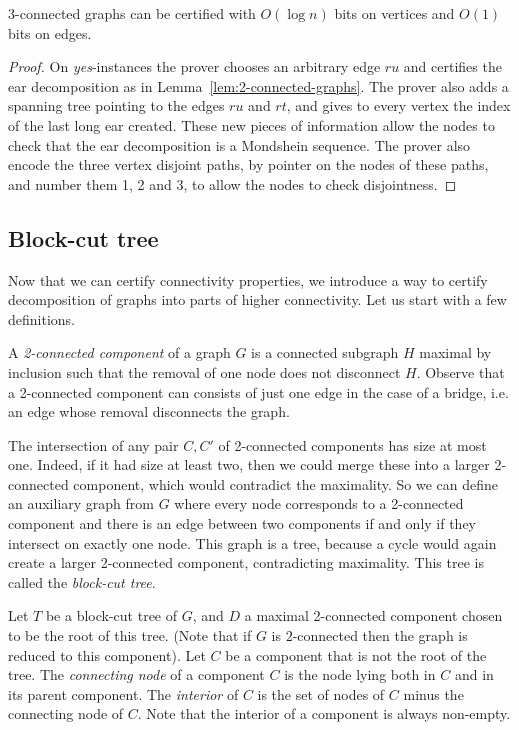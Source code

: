 \documentclass[a4paper,thm-restate,USenglish]{lipics-v2019}
\begin{document}
\begin{corollary}\label{coro:3-connected}
3-connected graphs can be certified with $O(\log n)$ bits on vertices and $O(1)$ bits on edges.
\end{corollary}

\begin{proof}
On \emph{yes}-instances the prover chooses an arbitrary edge $ru$ and certifies the ear decomposition as in Lemma~\ref{lem:2-connected-graphs}.
The prover also adds a spanning tree pointing to the edges $ru$ and $rt$, and gives to every vertex the index of the last long ear created.
These new pieces of information allow the nodes to check that the ear decomposition is a Mondshein sequence.
The prover also encode the three vertex disjoint paths, by pointer on the nodes of these paths, and number them 1, 2 and 3, to allow the nodes to check disjointness. 
\end{proof}

\subsection{Block-cut tree}

Now that we can certify connectivity properties, we introduce a way to certify decomposition of graphs into parts of higher connectivity. Let us start with a few definitions.

A \emph{2-connected component} of a graph $G$ is a connected subgraph $H$ maximal by inclusion such that the removal of one node does not disconnect $H$. Observe that a 2-connected component can consists of just one edge in the case of a bridge, i.e. an edge whose removal disconnects the graph.

The intersection of any pair $C,C'$ of 2-connected components has size at most one. 
Indeed, if it had size at least two, then we could merge these into a larger 2-connected component, which would contradict the maximality. 
So we can define an auxiliary graph from $G$ where every node corresponds to a 2-connected component and there is an edge between two components if and only if they intersect on exactly one node. This graph is a tree, because a cycle would again create a larger 2-connected component, contradicting maximality. 
This tree is called the \emph{block-cut tree}. 

Let $T$ be  a block-cut tree of $G$, and $D$ a maximal 2-connected component chosen to be the root of this tree. (Note that if $G$ is $2$-connected then the graph is reduced to this component). Let $C$ be a component that is not the root of the tree.  The \emph{connecting node} of a component $C$ is the node lying both in $C$ and in its parent component. The \emph{interior} of $C$ is the set of nodes of $C$ minus the connecting node of $C$. Note that the interior of a component is always non-empty.
\end{document}
